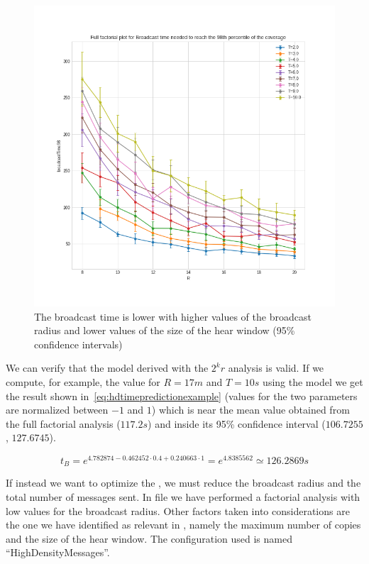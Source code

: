 \begin{figure}
	\centering
	\includegraphics[width=\textwidth]{img/hd/broadcasttime-R-ffplot}
	\caption{The broadcast time is lower with higher values of the broadcast
	radius and lower values of the size of the hear
	window (95\% confidence intervals)}\label{fig:hdtimeff}
\end{figure}

We can verify that the model derived with the \(2^{k}r\) analysis is valid. If we
compute, for example, the value for \(R\!=\!17m\) and \(T\!=\!10s\) using the
model we get the result shown in~\eqref{eq:hdtimepredictionexample} (values for
the two parameters are normalized between \(-1\) and \(1\)) which is near the
mean value obtained from the full factorial analysis (\(117.2s\)) and inside its
95\% confidence interval (\(106.7255\), \(127.6745\)).

\begin{equation}\label{eq:hdtimepredictionexample}
	t_B = e^{4.782874 - 0.462452 \cdot 0.4 + 0.240663 \cdot 1} =
	e^{4.8385562} \simeq 126.2869s
\end{equation}

If instead we want to optimize the , we must reduce
the broadcast radius and the total number of messages sent. In file
 we have performed a factorial analysis with low values for
the broadcast radius. Other factors taken into considerations are the one we
have identified as relevant in , namely the maximum number
of copies and the size of the hear window. The configuration used is named
``HighDensityMessages''.

